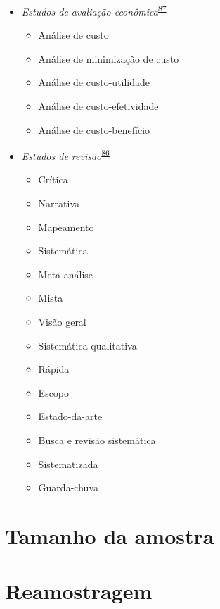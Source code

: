 \documentclass[
]{book}
\providecommand{\tightlist}{%
  \setlength{\itemsep}{0pt}\setlength{\parskip}{0pt}}
\begin{document}
\begin{itemize}
\tightlist
\item
  \emph{Estudos de avaliação econômica}\textsuperscript{\protect\hyperlink{ref-Suxfct2014}{87}}

  \begin{itemize}
  \tightlist
  \item
    Análise de custo
  \item
    Análise de minimização de custo
  \item
    Análise de custo-utilidade
  \item
    Análise de custo-efetividade
  \item
    Análise de custo-benefício
  \end{itemize}
\end{itemize}

\begin{itemize}
\tightlist
\item
  \emph{Estudos de revisão}\textsuperscript{\protect\hyperlink{ref-Grant2009}{86}}

  \begin{itemize}
  \tightlist
  \item
    Crítica
  \item
    Narrativa
  \item
    Mapeamento
  \item
    Sistemática
  \item
    Meta-análise
  \item
    Mista
  \item
    Visão geral
  \item
    Sistemática qualitativa
  \item
    Rápida
  \item
    Escopo
  \item
    Estado-da-arte
  \item
    Busca e revisão sistemática
  \item
    Sistematizada
  \item
    Guarda-chuva
  \end{itemize}
\end{itemize}

\hypertarget{tamanho-amostral}{%
\chapter{\texorpdfstring{\textbf{Tamanho da amostra}}{Tamanho da amostra}}\label{tamanho-amostral}}

\hypertarget{reamostragem}{%
\chapter{\texorpdfstring{\textbf{Reamostragem}}{Reamostragem}}\label{reamostragem}}
\end{document}
